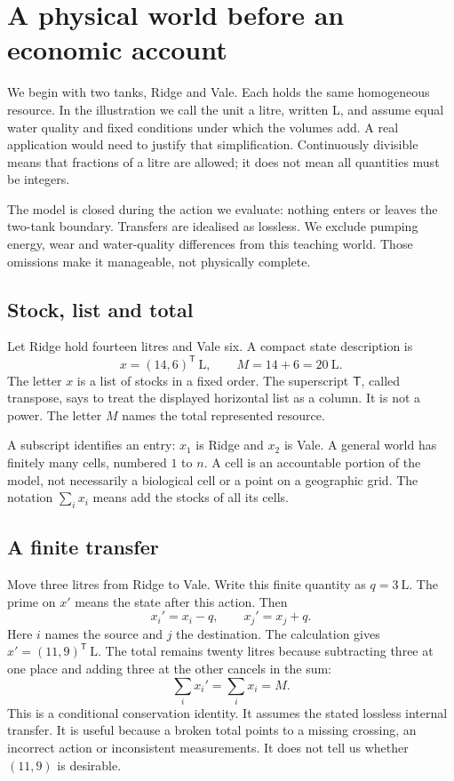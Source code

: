 \chapter{A physical world before an economic account}\label{ch:world}

We begin with two tanks, Ridge and Vale. Each holds the same homogeneous resource. In the illustration we call the unit a litre, written L, and assume equal water quality and fixed conditions under which the volumes add. A real application would need to justify that simplification. Continuously divisible means that fractions of a litre are allowed; it does not mean all quantities must be integers.

The model is closed during the action we evaluate: nothing enters or leaves the two-tank boundary. Transfers are idealised as lossless. We exclude pumping energy, wear and water-quality differences from this teaching world. Those omissions make it manageable, not physically complete.

\section{Stock, list and total}
Let Ridge hold fourteen litres and Vale six. A compact state description is
\begin{equation}
 x=(14,6)^{\mathsf T}\ \mathrm{L},\qquad M=14+6=20\ \mathrm{L}.
\end{equation}
The letter $x$ is a list of stocks in a fixed order. The superscript $\mathsf T$, called transpose, says to treat the displayed horizontal list as a column. It is not a power. The letter $M$ names the total represented resource.

A subscript identifies an entry: $x_1$ is Ridge and $x_2$ is Vale. A general world has finitely many cells, numbered $1$ to $n$. A cell is an accountable portion of the model, not necessarily a biological cell or a point on a geographic grid. The notation $\sum_i x_i$ means add the stocks of all its cells.

\section{A finite transfer}
Move three litres from Ridge to Vale. Write this finite quantity as $q=3\ \mathrm{L}$. The prime on $x'$ means the state after this action. Then
\begin{equation}\label{eq:transfer}
 x_i'=x_i-q,\qquad x_j'=x_j+q.
\end{equation}
Here $i$ names the source and $j$ the destination. The calculation gives $x'=(11,9)^{\mathsf T}\ \mathrm{L}$. The total remains twenty litres because subtracting three at one place and adding three at the other cancels in the sum:
\begin{equation}
 \sum_i x_i'=\sum_i x_i=M.
\end{equation}
This is a conditional conservation identity. It assumes the stated lossless internal transfer. It is useful because a broken total points to a missing crossing, an incorrect action or inconsistent measurements. It does not tell us whether $(11,9)$ is desirable.


